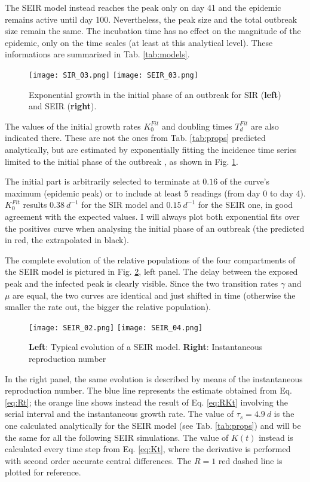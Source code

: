 \documentclass[DIV=12, BCOR=0pt]{scrartcl}  %
\begin{document}
	The SEIR model instead reaches the peak only on day 41 and the epidemic remains active until day 100. Nevertheless, the peak size and the total outbreak size remain the same. The incubation time has no effect on the magnitude of the epidemic, only on the time scales (at least at this analytical level). These informations are summarized in Tab. \ref{tab:models}. 
	\begin{figure}[h!]
		\centering
		\texttt{[image: SIR\_03.png]}
		\texttt{[image: SEIR\_03.png]}
		\caption{Exponential growth in the initial phase of an outbreak for SIR (\textbf{left}) and SEIR (\textbf{right}). }
		\label{fig:BothExp}
	\end{figure}

	The values of the initial growth rates $K_0^{Fit}$ and doubling times $T_d^{Fit}$ are also indicated there. These are not the ones from Tab. \ref{tab:props} predicted analytically, but are estimated by exponentially fitting the incidence time series limited to the initial phase of the outbreak \citep{Bauch2005}, as shown in Fig. \ref{fig:BothExp}.
	 
	The initial part is arbitrarily selected to terminate at $0.16$ of the curve's maximum (epidemic peak) or to include at least 5 readings (from day 0 to day 4). 
	$K_0^{Fit}$ results $0.38 \ d^{-1}$ for the SIR model and  $0.15 \ d^{-1}$ for the SEIR one, in good agreement with the expected values. I will always plot both exponential fits over the positives curve when analysing the initial phase of an outbreak (the predicted in red, the extrapolated in black). 
	
	
	The complete evolution of the relative populations of the four compartments of the SEIR model is pictured in Fig. \ref{fig:SEIRboth}, left panel. The delay between the exposed peak and the infected peak is clearly visible. Since the two transition rates $\gamma$ and $\mu$ are equal, the two curves are identical and just shifted in time (otherwise the smaller the rate out, the bigger the relative population).
	\begin{figure}[h!]
		\centering
		\texttt{[image: SEIR\_02.png]}
		\texttt{[image: SEIR\_04.png]}
		\caption{\textbf{Left}: Typical evolution of a SEIR model. \textbf{Right}: Instantaneous reproduction number }
		\label{fig:SEIRboth}
	\end{figure}

	In the right panel, the same evolution is described by means of the instantaneous reproduction number. The blue line represents the estimate obtained from Eq. \ref{eq:Rt}; the orange line shows instead the result of Eq. \ref{eq:RKt} involving the serial interval and the instantaneous growth rate.  The value of $\tau_s = 4.9 \ d$ is the one calculated analytically for the SEIR model (see Tab. \ref{tab:props}) and will be the same for all the following SEIR simulations.
	The value of $K(t)$ instead is calculated every time step from Eq. \ref{eq:Kt}, where the derivative is performed with second order accurate central differences. The $R = 1$ red dashed line is plotted for reference.
\end{document}
